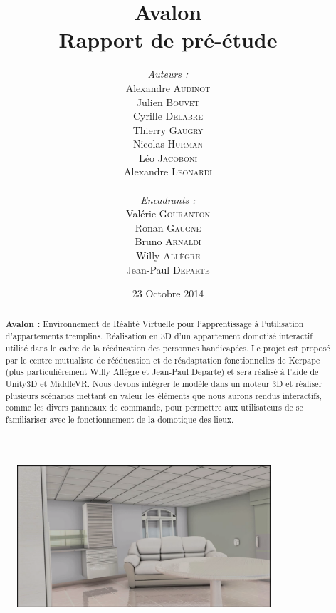 \documentclass[a4paper,11pt]{article}
\title{
  \textbf{Avalon}\\
  Rapport de pré-étude
}
\author{
\begin{minipage}{0.4\textwidth}
	\begin{flushleft} \large
		\emph{Auteurs :}\\
		Alexandre \textsc{Audinot}\\
		Julien \textsc{Bouvet}\\
		Cyrille \textsc{Delabre}\\
		Thierry \textsc{Gaugry}\\
		Nicolas \textsc{Hurman}\\
		Léo \textsc{Jacoboni}\\
		Alexandre \textsc{Leonardi}\\
	\end{flushleft}
\end{minipage}
\begin{minipage}{0.4\textwidth}
	\begin{flushright} \large
		\emph{Encadrants :} \\
		Valérie \textsc{Gouranton}\\
		Ronan \textsc{Gaugne}\\
		Bruno \textsc{Arnaldi}\\
		Willy \textsc{Allègre}\\
		Jean-Paul  \textsc{Departe}\\
	\end{flushright}
\end{minipage}
}
\date{23 Octobre 2014}
\begin{document}
\maketitle
\thispagestyle{empty}
\begin{abstract}
\textbf{Avalon :} Environnement de Réalité Virtuelle pour l'apprentissage à l'utilisation d'appartements tremplins. Réalisation en 3D d'un appartement domotisé interactif utilisé dans le cadre de la rééducation des personnes handicapées.
Le projet est proposé par le centre mutualiste de rééducation et de réadaptation fonctionnelles de Kerpape (plus particulièrement Willy Allègre et Jean-Paul Departe) et sera réalisé à l'aide de Unity3D et MiddleVR.
Nous devons intégrer le modèle dans un moteur 3D et réaliser plusieurs scénarios mettant en valeur les éléments que nous aurons rendus interactifs, comme les divers panneaux de commande, pour permettre aux utilisateurs de se familiariser avec le fonctionnement de la domotique des lieux.
\end{abstract}

\begin{figure}[h!]
	\centering
	\includegraphics[height=150pt]{1-PreEtude/img/screen_appart.png}
\end{figure}

\vfill
\end{document}
